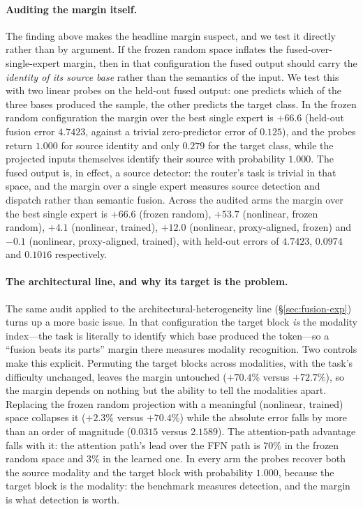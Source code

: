 \documentclass[10pt,twoside]{article}
\theoremstyle{definition}
\theoremstyle{plain}
\theoremstyle{remark}
\begin{document}
\paragraph{Auditing the margin itself.}
The finding above makes the headline margin suspect, and we test it directly rather than by
argument. If the frozen random space inflates the fused-over-single-expert margin, then in that
configuration the fused output should carry the \emph{identity of its source base} rather than the
semantics of the input. We test this with two linear probes on the held-out fused output: one
predicts which of the three bases produced the sample, the other predicts the target class. In the
frozen random configuration the margin over the best single expert is $+66.6$ (held-out fusion
error $4.7423$, against a trivial zero-predictor error of $0.125$), and the probes return
$1.000$ for source identity and only $0.279$ for the target class, while the projected inputs
themselves identify their source with probability $1.000$. The fused output is, in effect, a
source detector: the router's task is trivial in that space, and the margin over a single expert
measures source detection and dispatch rather than semantic fusion. Across the audited arms the
margin over the best single expert is $+66.6$ (frozen random), $+53.7$ (nonlinear, frozen
random), $+4.1$ (nonlinear, trained), $+12.0$ (nonlinear, proxy-aligned, frozen) and
$-0.1$ (nonlinear, proxy-aligned, trained), with held-out errors of $4.7423$, $0.0974$ and
$0.1016$ respectively.

\paragraph{The architectural line, and why its target is the problem.} The same audit applied to the architectural-heterogeneity line (\S\ref{sec:fusion-exp}) turns up a more basic issue. In that configuration the target block \emph{is} the modality index---the task is literally to identify which base produced the token---so a ``fusion beats its parts'' margin there measures modality recognition. Two controls make this explicit. Permuting the target blocks across modalities, with the task's difficulty unchanged, leaves the margin untouched ($+70.4\%$ versus $+72.7\%$), so the margin depends on nothing but the ability to tell the modalities apart. Replacing the frozen random projection with a meaningful (nonlinear, trained) space collapses it ($+2.3\%$ versus $+70.4\%$) while the absolute error falls by more than an order of magnitude ($0.0315$ versus $2.1589$). The attention-path advantage falls with it: the attention path's lead over the FFN path is $70\%$ in the frozen random space and $3\%$ in the learned one. In every arm the probes recover both the source modality and the target block with probability $1.000$, because the target block is the modality: the benchmark measures detection, and the margin is what detection is worth.
\end{document}
